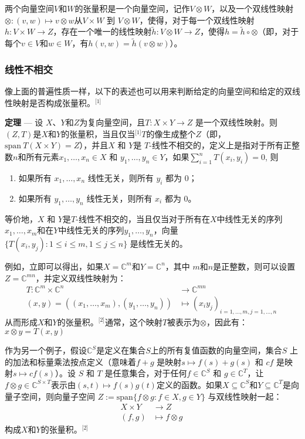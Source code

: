 两个向量空间\( V \)和\( W \)的张量积是一个向量空间，记作\( V \otimes W \)，以及一个双线性映射\(\otimes : (v, w) \mapsto v \otimes w\)从\( V \times W \) 到 \( V \otimes W \)，使得，对于每一个双线性映射\( h: V \times W \to Z \)，存在一个唯一的线性映射\( \tilde{h}: V \otimes W \to Z \)，使得\(h = \tilde{h} \circ \otimes\)（即，对于每个\( v \in V \)和\( w \in W \)，有\( h(v, w) = \tilde{h}(v \otimes w) \)）。
\subsubsection{线性不相交}
像上面的普遍性质一样，以下的表述也可以用来判断给定的向量空间和给定的双线性映射是否构成张量积。\(^\text{[1]}\)

\textbf{定理} — 设 \( X \)、\( Y \)和\( Z \)为复向量空间，且\( T: X \times Y \to Z \) 是一个双线性映射。则 \( (Z, T) \)是\( X \)和\( Y \)的张量积，当且仅当\(^\text{[1]}\)\( T \)的像生成整个\( Z \)（即，\( \text{span} \ T(X \times Y) = Z \)），并且\( X \) 和 \( Y \)是 \( T \)-线性不相交的，定义上是指对于所有正整数\( n \)和所有元素\( x_1, \dots, x_n \in X \) 和 \( y_1, \dots, y_n \in Y \)，如果\(\sum_{i=1}^{n} T(x_i, y_i) = 0\), 则  
\begin{enumerate}
\item 如果所有 \( x_1, \dots, x_n \) 线性无关，则所有 \( y_i \) 都为 0；  
\item 如果所有 \( y_1, \dots, y_n \) 线性无关，则所有 \( x_i \) 都为 0。
\end{enumerate}
等价地，\( X \) 和 \( Y \)是\( T \)-线性不相交的，当且仅当对于所有在\( X \)中线性无关的序列\( x_1, \dots, x_m \)和在\( Y \)中线性无关的序列\( y_1, \dots, y_n \)，向量\(\{ T(x_i, y_j) : 1 \leq i \leq m, 1 \leq j \leq n \}\)
是线性无关的。

例如，立即可以得出，如果\( X = \mathbb{C}^m \)和\( Y = \mathbb{C}^n \)，其中 \( m \)和\( n \)是正整数，则可以设置\( Z = \mathbb{C}^{mn} \)，并定义双线性映射为：
\[
\begin{aligned}
T: \mathbb{C}^m \times \mathbb{C}^n &\to \mathbb{C}^{mn}\\
(x, y) = \left( (x_1, \ldots, x_m), (y_1, \ldots, y_n) \right) &\mapsto (x_i y_j)_{i=1, \ldots, m, j=1, \ldots, n}
\end{aligned}~
\]
从而形成\( X \)和\( Y \)的张量积。\(^\text{[2]}\)通常，这个映射\( T \)被表示为\( \otimes \)，因此有：\(x \otimes y = T(x, y)\)

作为另一个例子，假设\( \mathbb{C}^S \)是定义在集合\( S \)上的所有复值函数的向量空间，集合\( S \) 上的加法和标量乘法按点定义（意味着\( f + g \) 是映射\( s \mapsto f(s) + g(s) \) 和 \( c f \) 是映射\( s \mapsto c f(s) \)）。设 \( S \) 和 \( T \) 是任意集合，对于任何\( f \in \mathbb{C}^S \) 和 \( g \in \mathbb{C}^T \)，让\( f \otimes g \in \mathbb{C}^{S \times T} \)表示由\( (s, t) \mapsto f(s) g(t) \)定义的函数。如果\( X \subseteq \mathbb{C}^S \)和\( Y \subseteq \mathbb{C}^T \)是向量子空间，则向量子空间 \( Z := \text{span} \{ f \otimes g : f \in X, g \in Y \} \) 与双线性映射一起：
\[
\begin{aligned}
X \times Y &\to Z \\
(f, g) &\mapsto f \otimes g
\end{aligned}~
\]
构成\( X \)和\( Y \)的张量积。\(^\text{[2]}\)
